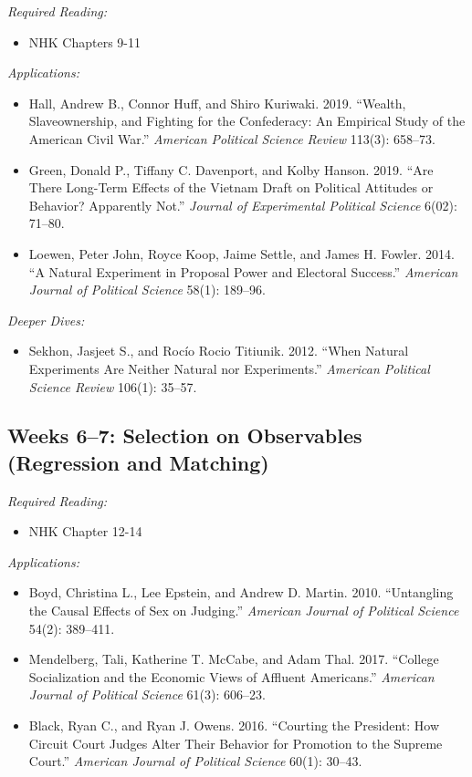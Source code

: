 \documentclass[11pt, letterpaper]{article}
\begin{document}
\textit{Required Reading:}

\begin{itemize}
	\item NHK Chapters 9-11

\end{itemize}

\noindent \textit{Applications:}

\begin{itemize}
	\item Hall, Andrew B., Connor Huff, and Shiro Kuriwaki. 2019. ``Wealth, Slaveownership, and Fighting for the Confederacy: An Empirical Study of the American Civil War.'' \textit{American Political Science Review} 113(3): 658–73.
	\item Green, Donald P., Tiffany C. Davenport, and Kolby Hanson. 2019. ``Are There Long-Term Effects of the Vietnam Draft on Political Attitudes or Behavior? Apparently Not.'' \textit{Journal of Experimental Political Science} 6(02): 71–80.
	\item Loewen, Peter John, Royce Koop, Jaime Settle, and James H. Fowler. 2014. “A Natural Experiment in Proposal Power and Electoral Success.” \textit{American Journal of Political Science} 58(1): 189–96.
\end{itemize}

\noindent \textit{Deeper Dives:}

\begin{itemize}
	\item Sekhon, Jasjeet S., and Rocío Rocio Titiunik. 2012. ``When Natural Experiments Are Neither Natural nor Experiments.'' \textit{American Political Science Review} 106(1): 35–57.
\end{itemize}

\subsection*{Weeks 6--7: Selection on Observables (Regression and Matching)}

\textit{Required Reading:}

\begin{itemize}
	\item NHK Chapter 12-14
\end{itemize}

\noindent \textit{Applications:}

\begin{itemize}
	\item Boyd, Christina L., Lee Epstein, and Andrew D. Martin. 2010. ``Untangling the Causal Effects of Sex on Judging.'' \textit{American Journal of Political Science} 54(2): 389–411.
	\item Mendelberg, Tali, Katherine T. McCabe, and Adam Thal. 2017. ``College Socialization and the Economic Views of Affluent Americans.'' \textit{American Journal of Political Science} 61(3): 606–23.
	\item Black, Ryan C., and Ryan J. Owens. 2016. “Courting the President: How Circuit Court Judges Alter Their Behavior for Promotion to the Supreme Court.” \textit{American Journal of Political Science} 60(1): 30–43.
\end{itemize}
\end{document}
